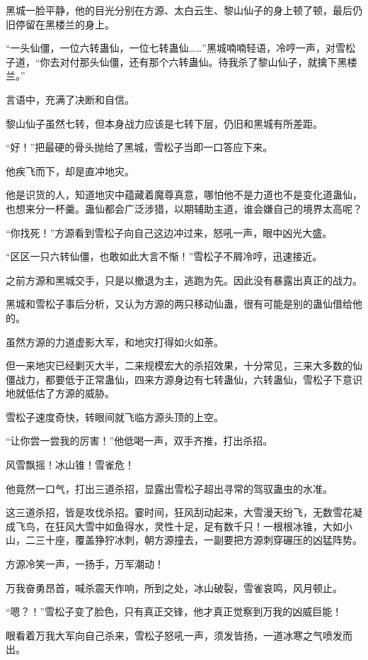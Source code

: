 \begin{this_body}
黑城一脸平静，他的目光分别在方源、太白云生、黎山仙子的身上顿了顿，最后仍旧停留在黑楼兰的身上。

“一头仙僵，一位六转蛊仙，一位七转蛊仙……”黑城喃喃轻语，冷哼一声，对雪松子道，“你去对付那头仙僵，还有那个六转蛊仙。待我杀了黎山仙子，就擒下黑楼兰。”

言语中，充满了决断和自信。

黎山仙子虽然七转，但本身战力应该是七转下层，仍旧和黑城有所差距。

“好！”把最硬的骨头抛给了黑城，雪松子当即一口答应下来。

他疾飞而下，却是直冲地灾。

他是识货的人，知道地灾中蕴藏着魔尊真意，哪怕他不是力道也不是变化道蛊仙，也想来分一杯羹。蛊仙都会广泛涉猎，以期辅助主道，谁会嫌自己的境界太高呢？

“你找死！”方源看到雪松子向自己这边冲过来，怒吼一声，眼中凶光大盛。

“区区一只六转仙僵，也敢如此大言不惭！”雪松子不屑冷哼，迅速接近。

之前方源和黑城交手，只是以撤退为主，逃跑为先。因此没有暴露出真正的战力。

黑城和雪松子事后分析，又认为方源的两只移动仙蛊，很有可能是别的蛊仙借给他的。

虽然方源的力道虚影大军，和地灾打得如火如荼。

但一来地灾已经剿灭大半，二来规模宏大的杀招效果，十分常见，三来大多数的仙僵战力，都要低于正常蛊仙，四来方源身边有七转蛊仙，六转蛊仙，雪松子下意识地就低估了方源的威胁。

雪松子速度奇快，转眼间就飞临方源头顶的上空。

“让你尝一尝我的厉害！”他低喝一声，双手齐推，打出杀招。

风雪飘摇！冰山锥！雪雀危！

他竟然一口气，打出三道杀招，显露出雪松子超出寻常的驾驭蛊虫的水准。

这三道杀招，皆是攻伐杀招。霎时间，狂风刮动起来，大雪漫天纷飞，无数雪花凝成飞鸟，在狂风大雪中如鱼得水，灵性十足，足有数千只！一根根冰锥，大如小山，二三十座，覆盖狰狞冰刺，朝方源撞去，一副要把方源刺穿碾压的凶猛阵势。

方源冷笑一声，一扬手，万军潮动！

万我奋勇昂首，喊杀震天作响，所到之处，冰山破裂，雪雀哀鸣，风月顿止。

“嗯？！”雪松子变了脸色，只有真正交锋，他才真正觉察到万我的凶威巨能！

眼看着万我大军向自己杀来，雪松子怒吼一声，须发皆扬，一道冰寒之气喷发而出。


\end{this_body}
